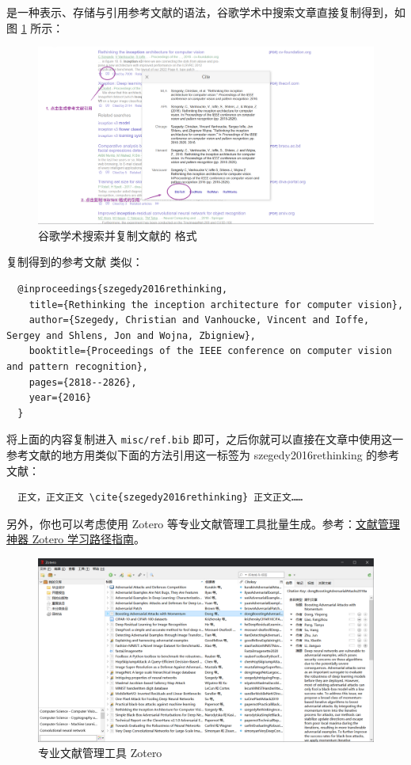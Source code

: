  是一种表示、存储与引用参考文献的语法，谷歌学术中搜索文章直接复制得到，如图 \ref{google_scholar} 所示：

\begin{figure}[H]
  \center
  \includegraphics[width=\textwidth]{images/google_scholar.png}
  \caption{谷歌学术搜索并复制文献的  格式}
  \label{google_scholar}
\end{figure}

复制得到的参考文献  类似：

\begin{verbatim}
  @inproceedings{szegedy2016rethinking,
    title={Rethinking the inception architecture for computer vision},
    author={Szegedy, Christian and Vanhoucke, Vincent and Ioffe, Sergey and Shlens, Jon and Wojna, Zbigniew},
    booktitle={Proceedings of the IEEE conference on computer vision and pattern recognition},
    pages={2818--2826},
    year={2016}
  }
\end{verbatim}

将上面的内容复制进入 \texttt{misc/ref.bib} 即可，之后你就可以直接在文章中使用这一参考文献的地方用类似下面的方法引用这一标签为 szegedy2016rethinking 的参考文献：

\begin{verbatim}
  正文，正文正文 \cite{szegedy2016rethinking} 正文正文……
\end{verbatim}

另外，你也可以考虑使用 Zotero 等专业文献管理工具批量生成。参考：\href{https://sspai.com/post/56724}{文献管理神器 Zotero 学习路径指南}。

\begin{figure}[H]
  \center
  \includegraphics[width=\textwidth]{images/zotero.png}
  \caption{专业文献管理工具 Zotero}
\end{figure}

